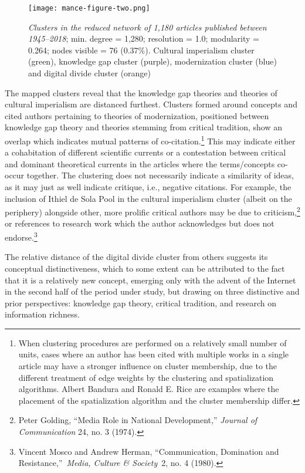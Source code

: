 \documentclass{tufte-handout}
\begin{document}
\begin{figure}
    \centering
    \texttt{[image: mance-figure-two.png]}
    \caption{\emph{Clusters in the reduced network of 1,180 articles
published between 1945--2018}; min. degree = 1,280; resolution = 1.0;
modularity = 0.264; nodes visible = 76 (0.37\%). Cultural imperialism
cluster (green), knowledge gap cluster (purple), modernization cluster
(blue) and digital divide cluster (orange)}
    \label{fig:two}
\end{figure}


The mapped clusters reveal that the knowledge gap theories and theories
of cultural imperialism are distanced furthest. Clusters formed around
concepts and cited authors pertaining to theories of modernization,
positioned between knowledge gap theory and theories stemming from
critical tradition, show an overlap which indicates mutual patterns of
co-citation.\footnote{When clustering procedures are performed on a
  relatively small number of units, cases where an author has been cited
  with multiple works in a single article may have a stronger influence
  on cluster membership, due to the different treatment of edge weights
  by the clustering and spatialization algorithms. Albert Bandura and
  Ronald E. Rice are examples where the placement of the spatialization
  algorithm and the cluster membership differ.} This may indicate either
a cohabitation of different scientific currents or a contestation
between critical and dominant theoretical currents in the articles where
the terms/concepts co-occur together. The clustering does not
necessarily indicate a similarity of ideas, as it may just as well
indicate critique, i.e., negative citations. For example, the inclusion
of Ithiel de Sola Pool in the cultural imperialism cluster (albeit on
the periphery) alongside other, more prolific critical authors may be
due to criticism,\footnote{Peter Golding, ``Media Role in National
  Development,'' \emph{Journal of Communication} 24, no. 3 (1974).} or
references to research work which the author acknowledges but does not
endorse.\footnote{Vincent Mosco and Andrew Herman, ``Communication,
  Domination and Resistance,''~\emph{Media, Culture \& Society}~2, no. 4
  (1980).}

The relative distance of the digital divide cluster from others suggests
its conceptual distinctiveness, which to some extent can be attributed
to the fact that it is a relatively new concept, emerging only with the
advent of the Internet in the second half of the period under study, but
drawing on three distinctive and prior perspectives: knowledge gap
theory, critical tradition, and research on information richness.
\end{document}
